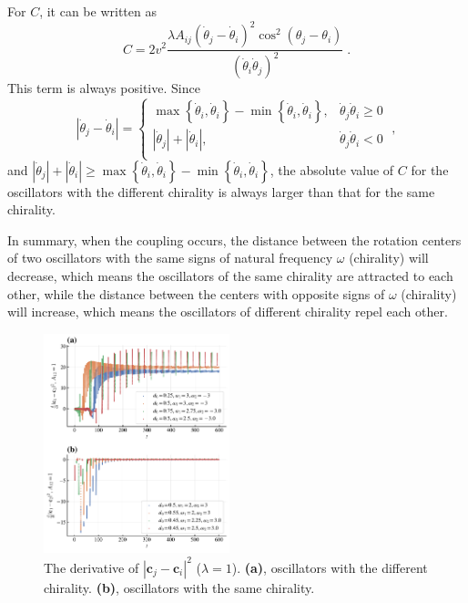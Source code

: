 \documentclass[%
 aip,
 amsmath,amssymb,
 reprint,%
]{revtex4-1}
\begin{document}
For $C$, it can be written as
\begin{equation}
    C=2v^2\frac{\lambda A_{ij}\left( \dot{\theta}_j-\dot{\theta}_i \right) ^2\cos ^2\left( \theta _j-\theta _i \right)}{\left( \dot{\theta}_i\dot{\theta}_j \right) ^2}\;.
\end{equation}
This term is always positive. Since
\begin{equation}
    \left| \dot{\theta}_j-\dot{\theta}_i \right|=\begin{cases}
        \max \left\{ \dot{\theta}_i,\dot{\theta}_i \right\} -\min \left\{ \dot{\theta}_i,\dot{\theta}_i \right\} ,&		\dot{\theta}_j\dot{\theta}_i\geqslant 0\\
        \left| \dot{\theta}_j \right|+\left| \dot{\theta}_i \right|,&		\dot{\theta}_j\dot{\theta}_i<0\\
    \end{cases}\;,
\end{equation}
and $\left| \dot{\theta}_j \right|+\left| \dot{\theta}_i \right|\geqslant \max \left\{ \dot{\theta}_i,\dot{\theta}_i \right\} -\min \left\{ \dot{\theta}_i,\dot{\theta}_i \right\}$, the absolute value of $C$ for the oscillators with the different chirality is always larger than that for the same chirality.

In summary, when the coupling occurs, the distance between the rotation centers of two oscillators with the same signs of natural frequency $\omega$ (chirality) will decrease, which means the oscillators of the same chirality are attracted to each other, while the distance between the centers with opposite signs of $\omega$ (chirality) will increase, which means the oscillators of different chirality repel each other. 

\begin{figure}[b]
    \includegraphics[width=0.48\textwidth]{./figs/2OsDotDistance.pdf}
    \caption{
        \label{fig:2OsDotDistance} The derivative of $\left| \mathbf{c}_j-\mathbf{c}_i \right|^2$ ($\lambda=1$).
        \textbf{(a)}, oscillators with the different chirality.
        \textbf{(b)}, oscillators with the same chirality.
    }
\end{figure}
\end{document}
